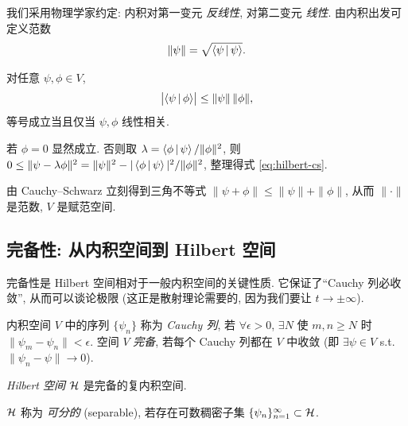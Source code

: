 我们采用物理学家约定: 内积对第一变元 \emph{反线性}, 对第二变元 \emph{线性}. 由内积出发可定义范数
\begin{equation}\label{eq:hilbert-norm}
\|\psi\|=\sqrt{\left\langle \psi \,\middle|\, \psi \right\rangle}.
\end{equation}

\begin{lemma}\label{lem:hilbert-cs}
对任意 $\psi,\phi\in V$,
\begin{equation}\label{eq:hilbert-cs}
\bigl|\left\langle \psi \,\middle|\, \phi \right\rangle\bigr|\leq \|\psi\|\,\|\phi\|,
\end{equation}
等号成立当且仅当 $\psi,\phi$ 线性相关.
\end{lemma}

\begin{proof*}
若 $\phi=0$ 显然成立. 否则取 $\lambda=\left\langle \phi \,\middle|\, \psi \right\rangle/\|\phi\|^2$, 则 $0\leq \|\psi-\lambda\phi\|^2=\|\psi\|^2-|\left\langle \phi \,\middle|\, \psi \right\rangle|^2/\|\phi\|^2$, 整理得式 \eqref{eq:hilbert-cs}.
\end{proof*}

由 Cauchy--Schwarz 立刻得到三角不等式 $\|\psi+\phi\|\leq\|\psi\|+\|\phi\|$, 从而 $\|\cdot\|$ 是范数, $V$ 是赋范空间.

\subsection{完备性: 从内积空间到 Hilbert 空间}

完备性是 Hilbert 空间相对于一般内积空间的关键性质. 它保证了``Cauchy 列必收敛'', 从而可以谈论极限 (这正是散射理论需要的, 因为我们要让 $t\to\pm\infty$).

\begin{definition}\label{def:hilbert-cauchy}
内积空间 $V$ 中的序列 $\{\psi_n\}$ 称为 \emph{Cauchy 列}, 若 $\forall\epsilon>0$, $\exists N$ 使 $m,n\geq N$ 时 $\|\psi_m-\psi_n\|<\epsilon$. 空间 $V$ \emph{完备}, 若每个 Cauchy 列都在 $V$ 中收敛 (即 $\exists\psi\in V$ s.t. $\|\psi_n-\psi\|\to 0$).
\end{definition}

\begin{definition}[Hilbert 空间]\label{def:hilbert-space}
\emph{Hilbert 空间} $\mathcal{H}$ 是完备的复内积空间.
\end{definition}

\begin{definition}\label{def:hilbert-sep}
$\mathcal{H}$ 称为 \emph{可分的} (separable), 若存在可数稠密子集 $\{\psi_n\}_{n=1}^{\infty}\subset\mathcal{H}$.
\end{definition}

